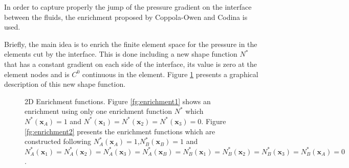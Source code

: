 \documentclass[a4paper,conference]{IEEEtran}
\newcommand{\xx}{\mathbf{x}}
\begin{document}
  In order to capture properly the jump of the pressure gradient on the interface between the fluids, the enrichment proposed by Coppola-Owen and Codina\cite{Coppola05} is used.

  Briefly, the main idea is to enrich the finite element space for the pressure in the elements cut by the interface. This is done including a new shape function $N^*$ that has a constant gradient on each side of the interface, its value is zero at the element nodes and is $C^0$ continuous in the element. Figure \ref{fg:enrichment} presents a graphical description of this new shape function.


  \begin{figure}[H]
  \centering
   \caption{2D Enrichment functions. Figure \ref{fg:enrichment1} shows an enrichment using only one enrichment function $N^*$ which $N^*(\xx_A)=1$ and $N^*(\xx_1)=N^*(\xx_2)=N^*(\xx_3)=0$. Figure \ref{fg:enrichment2} presents the enrichment functions which are constructed following $N_A^*(\xx_A)=1$,$N_B^*(\xx_B)=1$ and $N_A^*(\xx_1)=N_A^*(\xx_2)=N_A^*(\xx_3)=N_A^*(\xx_B)=N_B^*(\xx_1)=N_B^*(\xx_2)=N_B^*(\xx_3)=N_B^*(\xx_A)=0$ .}
   \label{fg:enrichment}                %
\end{figure}
\end{document}
